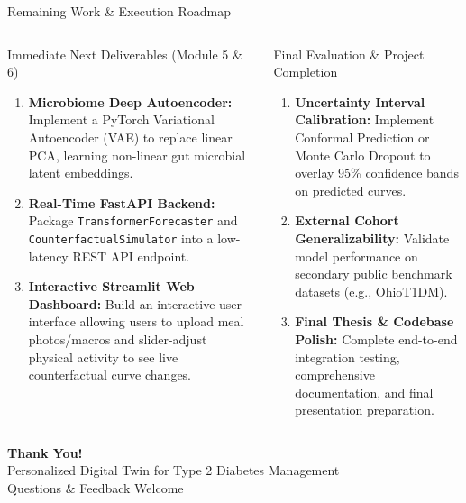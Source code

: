 \documentclass[10pt,aspectratio=169]{beamer}
\begin{document}
\begin{frame}{Remaining Work \& Execution Roadmap}
    \justifying
    \begin{columns}
        \begin{block}{Immediate Next Deliverables (Module 5 \& 6)}
            \begin{enumerate}
                \justifying
                \item \textbf{Microbiome Deep Autoencoder:} Implement a PyTorch Variational Autoencoder (VAE) to replace linear PCA, learning non-linear gut microbial latent embeddings.
                \item \textbf{Real-Time FastAPI Backend:} Package \texttt{TransformerForecaster} and \texttt{CounterfactualSimulator} into a low-latency REST API endpoint.
                \item \textbf{Interactive Streamlit Web Dashboard:} Build an interactive user interface allowing users to upload meal photos/macros and slider-adjust physical activity to see live counterfactual curve changes.
            \end{enumerate}
        \end{block}

        \begin{block}{Final Evaluation \& Project Completion}
            \begin{enumerate}
                \justifying
                \item \textbf{Uncertainty Interval Calibration:} Implement Conformal Prediction or Monte Carlo Dropout to overlay 95\% confidence bands on predicted curves.
                \item \textbf{External Cohort Generalizability:} Validate model performance on secondary public benchmark datasets (e.g., OhioT1DM).
                \item \textbf{Final Thesis & Codebase Polish:} Complete end-to-end integration testing, comprehensive documentation, and final presentation preparation.
            \end{enumerate}
        \end{block}
    \end{columns}
\end{frame}

\begin{frame}
    \centering
    \vspace{1cm}
    {\Huge \textbf{Thank You!}} \\[15pt]
    {\large Personalized Digital Twin for Type 2 Diabetes Management} \\[10pt]
    \small Questions \& Feedback Welcome
\end{frame}

\end{document}
